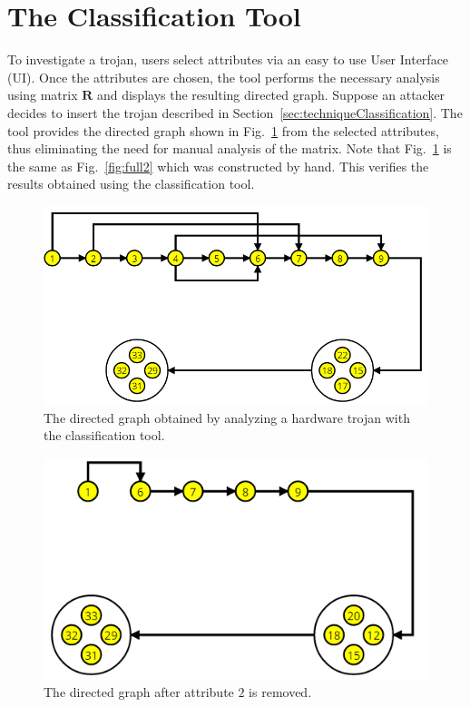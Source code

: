 \section{The Classification Tool} \label{sec:toolClassification}
To investigate a trojan, users select attributes via an easy to use User Interface (UI).
Once the attributes are chosen, the tool performs the necessary analysis using matrix $\mathbf{R}$ and displays the resulting directed graph.
Suppose an attacker decides to insert the trojan described in Section~\ref{sec:techniqueClassification}. %
The tool provides the directed graph shown in Fig.~\ref{fig:visualRepresentaion} from the selected attributes, thus eliminating the need for manual analysis of the matrix.
Note that Fig.~\ref{fig:visualRepresentaion} is the same as Fig.~\ref{fig:full2} which was constructed by hand.
This verifies the results obtained using the classification tool.
\begin{figure}[h]
	\centering
	\includegraphics[width=0.9\linewidth]{figures/visualRepresentaion}
	\caption{The directed graph obtained by analyzing a hardware trojan with the classification tool.}
	\label{fig:visualRepresentaion}
\end{figure}
\begin{figure}[h]
	\centering
	\includegraphics[width=0.75\linewidth]{figures/visualRepresentaion2}
	\caption{The directed graph after attribute $2$ is removed.}
	\label{fig:visualRepresentaion2}
\end{figure}

